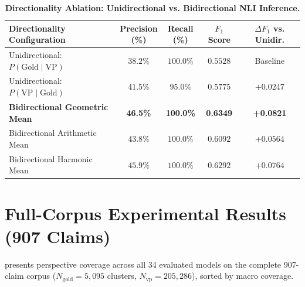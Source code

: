 \documentclass[11pt,a4paper]{article}
\begin{document}
\begin{table}[htbp]
\centering
\small
\caption{\textbf{Directionality Ablation: Unidirectional vs. Bidirectional NLI Inference.}}
\label{tab:bidirectional_ablation}
\begin{adjustbox}{max width=\linewidth}
\begin{tabular}{l c c c c}
\toprule
\makecell{\textbf{Directionality}\\\textbf{Configuration}} & \makecell{\textbf{Precision}\\\textbf{(\%)}} & \makecell{\textbf{Recall}\\\textbf{(\%)}} & \makecell{\textbf{$F_1$}\\\textbf{Score}} & \makecell{\textbf{$\Delta F_1$ vs.}\\\textbf{Unidir.}} \\
\midrule
Unidirectional: $P(\text{Gold} \mid \text{VP})$ & $38.2\%$ & $100.0\%$ & $0.5528$ & Baseline \\
Unidirectional: $P(\text{VP} \mid \text{Gold})$ & $41.5\%$ & $95.0\%$ & $0.5775$ & $+0.0247$ \\
\textbf{Bidirectional Geometric Mean} & \textbf{46.5\%} & \textbf{100.0\%} & \textbf{0.6349} & \textbf{+0.0821} \\
Bidirectional Arithmetic Mean & $43.8\%$ & $100.0\%$ & $0.6092$ & $+0.0564$ \\
Bidirectional Harmonic Mean & $45.9\%$ & $100.0\%$ & $0.6292$ & $+0.0764$ \\
\bottomrule
\end{tabular}
\end{adjustbox}
\end{table}

\section{Full-Corpus Experimental Results (907 Claims)}
\label{sec:full_results}

 presents perspective coverage across all 34 evaluated models on the complete 907-claim corpus ($N_{\text{gold}} = 5,095$ clusters, $N_{\text{vp}} = 205,286$), sorted by macro coverage.
\end{document}
